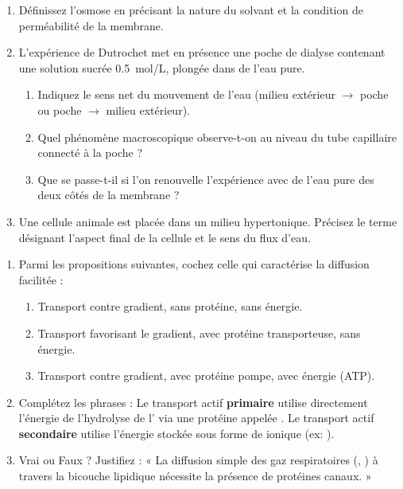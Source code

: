 \documentclass[11pt]{article}
\begin{document}
\begin{exercice}
\begin{enumerate}
    \item Définissez l'osmose en précisant la nature du solvant et la condition de perméabilité de la membrane.
    \item L'expérience de Dutrochet met en présence une poche de dialyse contenant une solution sucrée \SI{0,5}{mol/L}, plongée dans de l'eau pure.
    \begin{enumerate}
        \item Indiquez le sens net du mouvement de l'eau (milieu extérieur $\to$ poche ou poche $\to$ milieu extérieur).
        \item Quel phénomène macroscopique observe-t-on au niveau du tube capillaire connecté à la poche ?
        \item Que se passe-t-il si l'on renouvelle l'expérience avec de l'eau pure des deux côtés de la membrane ?
    \end{enumerate}
    \item Une cellule animale est placée dans un milieu hypertonique. Précisez le terme désignant l'aspect final de la cellule et le sens du flux d'eau.
\end{enumerate}
\end{exercice}

\begin{exercice}
\begin{enumerate}
    \item Parmi les propositions suivantes, cochez celle qui caractérise la diffusion facilitée :
    \begin{enumerate}
        \item Transport contre gradient, sans protéine, sans énergie.
        \item Transport favorisant le gradient, avec protéine transporteuse, sans énergie.
        \item Transport contre gradient, avec protéine pompe, avec énergie (ATP).
    \end{enumerate}
    \item Complétez les phrases : Le transport actif \textbf{primaire} utilise directement l'énergie de l'hydrolyse de l' via une protéine appelée \underline{\hspace{4cm}}. Le transport actif \textbf{secondaire} utilise l'énergie stockée sous forme de \underline{\hspace{4cm}} ionique (ex: ).
    \item Vrai ou Faux ? Justifiez : « La diffusion simple des gaz respiratoires (, ) à travers la bicouche lipidique nécessite la présence de protéines canaux. »
\end{enumerate}
\end{exercice}
\end{document}
